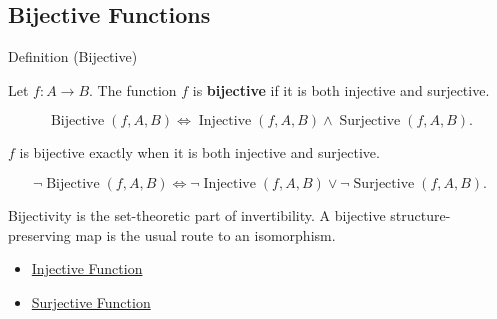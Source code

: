 \subsection*{Bijective Functions}
\label{subsec:bijective-functions}

\begin{definitionbox}{Definition (Bijective)}
\begin{definition}
\label{def:alg-bijective}
Let $f:A\to B$.
The function $f$ is \textbf{bijective} if it is both injective and surjective.
\end{definition}
\end{definitionbox}

\begin{remark*}
\[
\operatorname{Bijective}(f,A,B)
\Longleftrightarrow
\operatorname{Injective}(f,A,B)\land \operatorname{Surjective}(f,A,B).
\]
\end{remark*}

\begin{remark*}
$f$ is bijective exactly when it is both injective and surjective.
\end{remark*}

\begin{remark*}
\[
\neg\operatorname{Bijective}(f,A,B)
\Longleftrightarrow
\neg\operatorname{Injective}(f,A,B)
\lor
\neg\operatorname{Surjective}(f,A,B).
\]
\end{remark*}

\begin{remark*}[Interpretation]
Bijectivity is the set-theoretic part of invertibility.  A bijective
structure-preserving map is the usual route to an isomorphism.
\end{remark*}

\begin{dependencies}
\begin{itemize}
  \item \hyperref[def:alg-injective]{Injective Function}
  \item \hyperref[def:alg-surjective]{Surjective Function}
\end{itemize}
\end{dependencies}
